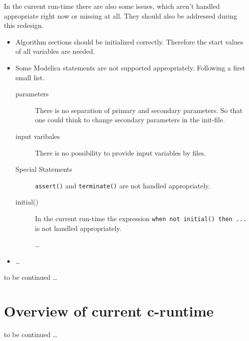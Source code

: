 In the current run-time there are also some issues, which aren't handled
appropriate right now or missing at all. They should also be addressed during
this redesign.
\begin{itemize}
  \item Algorithm sections should be initialized correctly. Therefore the start
  values of all variables are needed.
  \item Some Modelica statements are not supported appropriately.
  Following a first small list.
  \begin{description}
     \item[parameters] There is no separation of primary and secondary
     parameters. So that one could think to change secondary parameters in
     the init-file.
     \item[input varibales] There is no possibility to provide input variables
     by files.
     \item[Special Statements] \lstinline{assert()} and \lstinline{terminate()} are not handled
     appropriately. \\
     \item[initial()] In the current run-time the expression 
     \lstinline{when not initial() then ... } is not handled appropriately.
     \item[] \ldots
   \end{description} 
   \item \ldots
\end{itemize} 

to be continued \ldots

\section{Overview of current c-runtime}

to be continued \ldots

% 


